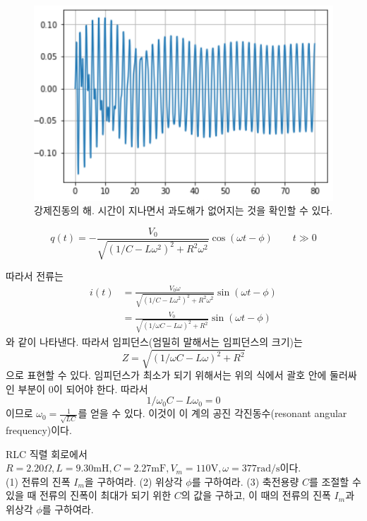 \begin{figure}[h]
\centering\includegraphics[scale=0.6]{Pictures/forced_oscillation.PNG}
\caption{강제진동의 해. 시간이 지나면서 과도해가 없어지는 것을 확인할 수 있다.}
\label{fig:forced_oscillation}
\end{figure}

\begin{equation}
q(t) = -\frac{V_0}{\sqrt{(1/C-L\omega^2)^2+R^2\omega^2}}\cos(\omega t-\phi)\quad\quad t\gg 0
\end{equation}


따라서 전류는
\begin{align}
i(t) &= \frac{V_0\omega}{\sqrt{(1/C-L\omega^2)^2+R^2\omega^2}}\sin(\omega t-\phi)\\
&= \frac{V_0}{\sqrt{(1/\omega C -L\omega)^2+R^2}}\sin(\omega t-\phi)
\end{align}
와 같이 나타낸다. 따라서 임피던스(엄밀히 말해서는 임피던스의 크기)는 
\begin{equation}
Z=\sqrt{(1/\omega C -L\omega)^2+R^2}
\end{equation}
으로 표현할 수 있다. 임피던스가 최소가 되기 위해서는 위의 식에서 괄호 안에 둘러싸인 부분이 0이 되어야 한다. 따라서
\begin{equation}
1/\omega_0C-L\omega_0=0
\end{equation}
이므로 $\omega_0=\frac{1}{\sqrt{LC}}$를 얻을 수 있다. 이것이 이 계의 공진 각진동수(resonant angular frequency)이다.
\begin{exercise}
RLC 직렬 회로에서 $R=2.20\Omega, L=9.30\mathrm{mH}, C=2.27\mathrm{mF}, V_m=110\mathrm{V}, \omega = 377\mathrm{rad/s}$이다. \\
(1) 전류의 진폭 $I_m$을 구하여라. (2) 위상각 $\phi$를 구하여라. (3) 축전용량 $C$를 조절할 수 있을 때 전류의 진폭이 최대가 되기 위한 $C$의 값을 구하고, 이 때의 전류의 진폭 $I_m$과 위상각 $\phi$를 구하여라.
\end{exercise}

